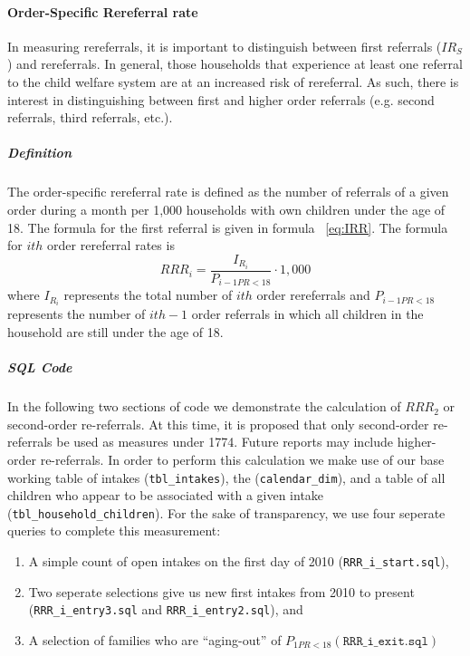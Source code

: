 \documentclass[12pt]{article}\usepackage[]{graphicx}\usepackage[]{color}
\begin{document}
\paragraph{Order-Specific Rereferral rate} In measuring rereferrals, it is important to distinguish between first referrals ($IR_S$) and rereferrals. In general, those households that experience at least one referral to the child welfare system are at an increased risk of rereferral. As such, there is interest in distinguishing between first and higher order referrals (e.g. second referrals, third referrals, etc.). 

\subparagraph{Definition} The order-specific rereferral rate is defined as the number of referrals of a given order during a month per 1,000 households with own children under the age of 18. The formula for the first referral is given in formula ~\ref{eq:IRR}. The formula for $ith$ order rereferral rates is 
\begin{equation}\label{eq:RRRi}
RRR_i = \frac{I_{R_i}}{P_{i-1PR<18}} \cdot 1,000
\end{equation}
where $I_{R_i}$ represents the total number of $ith$ order rereferrals and $P_{i-1PR<18}$ represents the number of $ith-1$ order referrals in which all children in the household are still under the age of 18.  

\subparagraph{SQL Code}

In the following two sections of code we demonstrate the calculation of $RRR_2$ or second-order re-referrals. At this time, it is proposed that only second-order re-referrals be used as measures under 1774. Future reports may include higher-order re-referrals. In order to perform this calculation we make use of our base working table of intakes (\texttt{tbl\_intakes}), the (\texttt{calendar\_dim}), and a table of all children who appear to be associated with a given intake (\texttt{tbl\_household\_children}). For the sake of transparency, we use four seperate queries to complete this measurement: 

\begin{enumerate}
  \item A simple count of open intakes on the first day of 2010 (\texttt{RRR\_i\_start.sql}),
  
  \FloatBarrier
  \item Two seperate selections give us new first intakes from 2010 to present (\texttt{RRR\_i\_entry3.sql} and \texttt{RRR\_i\_entry2.sql}), and 

  
  
  \item A selection of families who are ``aging-out'' of $P_{1PR<18} (\texttt{RRR\_i\_exit.sql})$
  
\end{enumerate}
\end{document}
